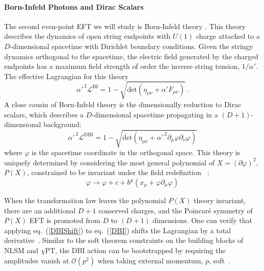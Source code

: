 \documentclass[11pt,letter]{article}
\def\eqn#1{eq.~(\ref{#1})}
\begin{document}
\paragraph{Born-Infeld Photons and Dirac Scalars}
The second even-point EFT we will study is Born-Infeld theory \cite{Born:1934gh}. This theory describes the dynamics of open string endpoints with $U(1)$ charge attached to a $D$-dimensional spacetime with Dirichlet boundary conditions. Given the stringy dynamics orthogonal to the spacetime, the electric field generated by the charged endpoints has a maximum field strength of order the inverse string tension, $1/\alpha'$. The effective Lagrangian for this theory
\begin{equation}
 \label{biLag}
  \alpha'^{\,2}\mathcal{L}^{\text{BI}} = 1-\sqrt{\text{det}(\eta_{\mu\nu}+\alpha' F_{\mu\nu})} \,.
\end{equation}
A close cousin of Born-Infeld theory is the dimensionally reduction to Dirac scalars, which describes a $D$-dimensional spacetime propagating in a $(D+1)$-dimensional background:
\begin{equation}
 \label{DBI}
  \alpha'^{\,2}\mathcal{L}^{\text{DBI}} =1- \sqrt{\text{det}(\eta_{\mu\nu}+\alpha'^{\,2} \partial_\mu \varphi \partial_\nu \varphi)}
\end{equation}
where $\varphi$ is the spacetime coordinate in the orthogonal space. This theory is uniquely determined by considering the most general polynomial  of $X=(\partial \varphi)^2$, $P(X)$,  constrained to be  invariant under the field redefinition~ \cite{Cheung:2016drk}:
\begin{equation}\label{DBIShift}
\varphi \rightarrow \varphi + c + b^{\mu} (x_\mu + \varphi \partial_\mu \varphi)
\end{equation}

When the transformation law leaves the polynomial $P(X)$ theory invariant, there are an additional $D+1$ conserved charges, and the Poincar\'{e} symmetry of $P(X)$ EFT is promoted from $D$ to $(D+1)$ dimensions. One can verify that applying \eqn{DBIShift} to \eqn{DBI} shifts the Lagrangian by a total derivative~\cite{deRham:2010eu}. Similar to the soft theorem constraints on the building blocks of NLSM and $\chi \text{PT}$, the DBI action can be bootstrapped by requiring the amplitudes vanish at $\mathcal{O}(p^2)$ when taking external momentum, $p$, soft~\cite{Cheung:2016drk}.
\end{document}
